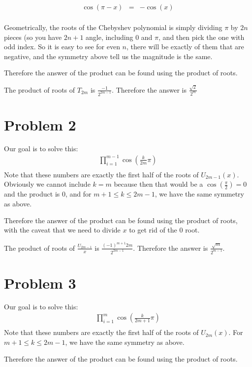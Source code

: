 \documentclass{article}
\begin{document}
\begin{eqnarray*}
  \cos(\pi - x) &=& -\cos(x) \\
\end{eqnarray*}

Geometrically, the roots of the Chebyshev polynomial is simply dividing $ \pi $ by $ 2n $ pieces (so you have $ 2n + 1 $ angle, including 0 and $ \pi $, and then pick the one with odd index. So it is easy to see for even $ n $, there will be exactly of them that are negative, and the symmetry above tell us the magnitude is the same. 

Therefore the answer of the product can be found using the product of roots.

The product of roots of $ T_{2m} $ is $ \frac{-1}{2^{2m-1}} $. Therefore the answer is $ \frac{\sqrt{2}}{2^m} $

\section{Problem 2}
Our goal is to solve this:
\begin{eqnarray*}
  \prod_{i=1}^{m-1}{\cos\left(\frac{k}{2m}\pi\right)} \\
\end{eqnarray*}
Note that these numbers are exactly the first half of the roots of $ U_{2m-1}(x) $. Obviously we cannot include $ k = m $ because then that would be a $ \cos\left(\frac{\pi}{2}\right) = 0 $ and the product is 0, and for $ m + 1 \le k \le 2m - 1$, we have the same symmetry as above.

Therefore the answer of the product can be found using the product of roots, with the caveat that we need to divide $ x $ to get rid of the 0 root.

The product of roots of $ \frac{U_{2m-1}}{x} $ is $ \frac{(-1)^{m+1} 2m}{2^{2m-1}} $. Therefore the answer is $ \frac{\sqrt{m}}{2^{m-1}} $.

\section{Problem 3}
Our goal is to solve this:
\begin{eqnarray*}
  \prod_{i=1}^{m}{\cos\left(\frac{k}{2m + 1}\pi\right)} \\
\end{eqnarray*}
Note that these numbers are exactly the first half of the roots of $ U_{2m}(x) $. For $ m + 1 \le k \le 2m - 1$, we have the same symmetry as above.

Therefore the answer of the product can be found using the product of roots.
\end{document}
